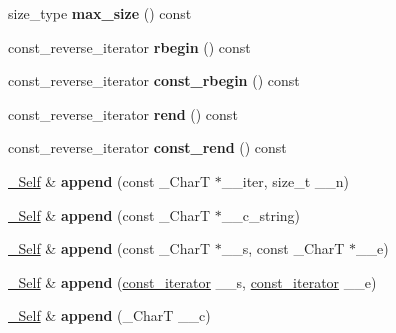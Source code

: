 \begin{DoxyCompactItemize}
size\+\_\+type {\bfseries max\+\_\+size} () const
\item 
\mbox{\label{classrope_a1085f40ffdc927cc67cc70ae978a7bf5}} 
const\+\_\+reverse\+\_\+iterator {\bfseries rbegin} () const
\item 
\mbox{\label{classrope_a0639fda0bc596ac7df00f994621eb090}} 
const\+\_\+reverse\+\_\+iterator {\bfseries const\+\_\+rbegin} () const
\item 
\mbox{\label{classrope_ae87f6b5d36b9341ecb2079fd78d179a2}} 
const\+\_\+reverse\+\_\+iterator {\bfseries rend} () const
\item 
\mbox{\label{classrope_a6139eee7365d48f7a6bef3c08b9ed2ac}} 
const\+\_\+reverse\+\_\+iterator {\bfseries const\+\_\+rend} () const
\item 
\mbox{\label{classrope_ae51d54dff0dfc691183b6bc6acb719f6}} 
\hyperlink{classrope}{\+\_\+\+Self} \& {\bfseries append} (const \+\_\+\+CharT $\ast$\+\_\+\+\_\+iter, size\+\_\+t \+\_\+\+\_\+n)
\item 
\mbox{\label{classrope_afad249707a0c5305a26aa9a1137cc4a8}} 
\hyperlink{classrope}{\+\_\+\+Self} \& {\bfseries append} (const \+\_\+\+CharT $\ast$\+\_\+\+\_\+c\+\_\+string)
\item 
\mbox{\label{classrope_a888714ec79e3f72633496f8b43ca3a77}} 
\hyperlink{classrope}{\+\_\+\+Self} \& {\bfseries append} (const \+\_\+\+CharT $\ast$\+\_\+\+\_\+s, const \+\_\+\+CharT $\ast$\+\_\+\+\_\+e)
\item 
\mbox{\label{classrope_aaa8301d250e303c8f8a5897c89f0ce06}} 
\hyperlink{classrope}{\+\_\+\+Self} \& {\bfseries append} (\hyperlink{class___rope__const__iterator}{const\+\_\+iterator} \+\_\+\+\_\+s, \hyperlink{class___rope__const__iterator}{const\+\_\+iterator} \+\_\+\+\_\+e)
\item 
\mbox{\label{classrope_a5f7a975201e225d4fbe3ab2f92f99c4f}} 
\hyperlink{classrope}{\+\_\+\+Self} \& {\bfseries append} (\+\_\+\+CharT \+\_\+\+\_\+c)
\item 
\mbox{\label{classrope_aa003716298761875b787de9e6dbc1901}} 

\end{DoxyCompactItemize}
